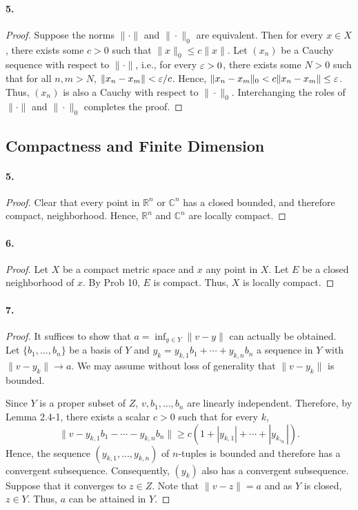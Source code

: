   \paragraph{5.}
  \begin{proof}
    Suppose the norms $\|\cdot\|$ and $\|\cdot\|_0$ are equivalent. Then for 
    every $x\in X$, there exists some $c>0$ such that $\|x\|_0\le c\|x\|$. Let
    $(x_n)$ be a Cauchy sequence with respect to $\|\cdot\|$, i.e., for every 
    $\varepsilon>0$, there exists some $N>0$ such that for all $n,m>N$, $\|x_n-x_m\|<
    \varepsilon/c$. Hence, $\|x_n-x_m\|_0<c\|x_n-x_m\|\le \varepsilon$. Thus, $(x_n)$ is also
    a Cauchy with respect to $\|\cdot\|_0$. Interchanging the roles of 
    $\|\cdot\|$ and $\|\cdot\|_0$ completes the proof.
  \end{proof}

\subsection{Compactness and Finite Dimension}
  \paragraph{5.}
  \begin{proof}
    Clear that every point in $\mathbb{R}^n$ or $\mathbb{C}^n$ has a closed 
    bounded, and therefore compact, neighborhood. Hence, $\mathbb{R}^n$ and 
    $\mathbb{C}^n$ are locally compact.
  \end{proof}

  \paragraph{6.}
  \begin{proof}
    Let $X$ be a compact metric space and $x$ any point in $X$. Let $E$ be a 
    closed neighborhood of $x$. By Prob 10, $E$ is compact. Thus, $X$ is locally
    compact.
  \end{proof}

  \paragraph{7.}
  \begin{proof}
    It suffices to show that $a=\inf_{y\in Y}\|v-y\|$ can actually be obtained.
    Let $\{b_1,\dots,b_n\}$ be a basis of $Y$ and $y_k=y_{k,1}b_1+\cdots+y_{k,n}
    b_n$ a sequence in $Y$ with $\|v-y_k\|\to a$. We may assume without loss of
    generality that $\|v-y_k\|$ is bounded. \par
    Since $Y$ is a proper subset of $Z$, $v,b_1,\dots,b_n$ are linearly
    independent. Therefore, by Lemma 2.4-1, there exists a scalar $c>0$ such
    that for every $k$,
    \[
      \|v-y_{k,1}b_1-\cdots-y_{k,n}b_n\| \ge c(1+|y_{k,1}|+\cdots+|y_{k,_n}|).
    \]
    Hence, the sequence $(y_{k,1},\dots,y_{k,n})$ of $n$-tuples is bounded and 
    therefore has a convergent subsequence. Consequently, $(y_k)$ also has a 
    convergent subsequence. Suppose that it converges to $z\in Z$. Note that
    $\|v-z\|=a$ and as $Y$ is closed, $z\in Y$. Thus, $a$ can be attained in 
    $Y$.
  \end{proof}

